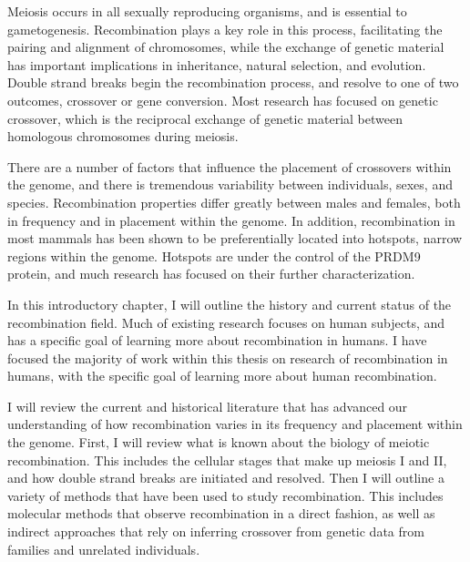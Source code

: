 

Meiosis occurs in all sexually reproducing organisms, and is essential to gametogenesis.
Recombination plays a key role in this process, facilitating the pairing and alignment of chromosomes, while the exchange of genetic material has important implications in inheritance, natural selection, and evolution.
Double strand breaks begin the recombination process, and resolve to one of two outcomes, crossover or gene conversion.
Most research  has focused on genetic crossover, which is the reciprocal exchange of genetic material between homologous chromosomes during meiosis.

There are a number of factors that influence the placement of crossovers within the genome, and there is tremendous variability between individuals, sexes, and species.
Recombination properties differ greatly between males and females, both in frequency and in placement within the genome.
In addition, recombination in most mammals has been shown to be preferentially located into hotspots, narrow regions within the genome.
Hotspots are under the control of the PRDM9 protein, and much research has focused on their further characterization.


In this introductory chapter, I will outline the history and current status of the recombination field.
Much of existing research focuses on human subjects, and has a specific goal of learning more about recombination in humans.
I have focused the majority of work within this thesis on research of recombination in humans, with the specific goal of learning more about human recombination.

I will review the current and historical literature that has advanced our understanding of how recombination varies in its frequency and placement within the genome.
First, I will review what is known about the biology of meiotic recombination.
This includes the cellular stages that make up meiosis I and II, and how double strand breaks are initiated and resolved. %
Then I will outline a variety of methods that have been used to study recombination.
This includes molecular methods that observe recombination in a direct fashion, as well as indirect approaches that rely on inferring crossover from genetic data from families and unrelated individuals.


